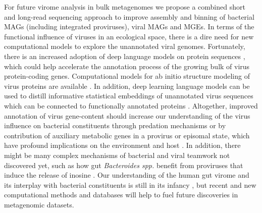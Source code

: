 \noindent
For future virome analysis in bulk metagenomes we propose a combined short and long-read sequencing approach to improve assembly and binning of bacterial MAGs (including integrated proviruses), viral MAGs and MGEs. In terms of the functional influence of viruses in an ecological space, there is a dire need for new computational models to explore the unannotated viral genomes. Fortunately, there is an increased adoption of deep language models on protein sequences \cite{Bepler2021-xn}, which could help accelerate the annotation process of the growing bulk of virus protein-coding genes. Computational models for ab initio structure modeling of virus proteins are available \cite{Jumper2021-dd}. In addition, deep learning language models can be used to distill informative statistical embeddings of unannotated virus sequences which can be connected to functionally annotated proteins \cite{Alley2019-el}. Altogether, improved annotation of virus gene-content should increase our understanding of the virus influence on bacterial constituents through predation mechanisms or by contribution of auxiliary metabolic genes in a provirus or episomal state, which have profound implications on the environment and host \cite{Thompson2011-oc,Mayneris-Perxachs2022-wi}. In addition, there might be many complex mechanisms of bacterial and viral teamwork not discovered yet, such as how gut \textit{Bacteroides spp.} benefit from proviruses that induce the release of inosine \cite{Brown2021-dw}. Our understanding of the human gut virome and its interplay with bacterial constituents is still in its infancy \cite{Garmaeva2019-ox}, but recent and new computational methods and databases will help to fuel future discoveries in metagenomic datasets.